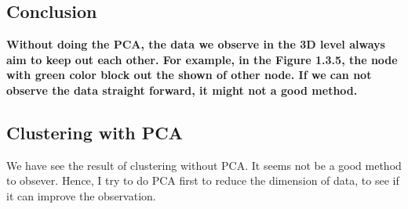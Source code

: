 \documentclass[titlepage,a4paper,12pt,thmsb]{report}
\begin{document}
\subsection{Conclusion}
{\bf Without doing the PCA, the data we observe in the 3D level always aim to keep out each other. For example, in the {\bf Figure 1.3.5}, the node with green color block out the shown of other node.  If we can not observe the data straight forward, it might not a good method.

\newpage


\subsection{Clustering with PCA}

We have see the result of clustering without PCA. It seems not be a good method to obsever.  Hence, I try to do PCA first to reduce the dimension of data, to see if it can improve the observation.

\begin{center}
\begin{figure}[h]
{\par}
\end{figure}
{}
\end{center}

\newpage


\begin{center}
\begin{figure}[h]
{\par}
\end{figure}
{}
\end{center}


\begin{center}
\begin{figure}[h]
{\par}
\end{figure}
{}
\end{center}
\newpage


\begin{center}
\begin{figure}[h]
{\par}
\end{figure}
{}
\end{center}

}
\end{document}
